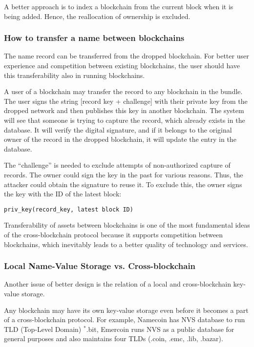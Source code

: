 \begin{multicols}{2}
A better approach is to index a blockchain from the current block when it is being added. Hence, the reallocation of ownership is excluded.

\subsubsection{How to transfer a name between blockchains}\label{subsubsec-4.2.5}

The name record can be transferred from the dropped blockchain. For better user experience and competition between existing blockchains, the user should have this transferability also in running blockchains.

A user of a blockchain may transfer the record to any blockchain in the bundle. The user signs the string [record key + challenge] with their private key from the dropped network and then publishes this key in another blockchain. The system will see that someone is trying to capture the record, which already exists in the database. It will verify the digital signature, and if it belongs to the original owner of the record in the dropped blockchain, it will update the entry in the database.

The “challenge” is needed to exclude attempts of non-authorized capture of records. The owner could sign the key in the past for various reasons. Thus, the attacker could obtain the signature to reuse it. To exclude this, the owner signs the key with the ID of the latest block:
\begin{center}
\texttt{priv\_key(record\_key, latest block ID)}
\end{center}

Transferability of assets between blockchains is one of the most fundamental ideas of the cross-blockchain protocol because it supports competition between blockchains, which inevitably leads to a better quality of technology and services.

\subsubsection{Local Name-Value Storage vs. Cross-blockchain}\label{subsubsec-4.2.6}

Another issue of better design is the relation of a local and cross-blockchain key-value storage.

Any blockchain may have its own key-value storage even before it becomes a part of a cross-blockchain protocol. For example, Namecoin has NVS database to run TLD (Top-Level Domain) $^\ast$.bit, Emercoin runs NVS as a public database for general purposes and also maintains four TLDs (.coin, .emc, .lib, .bazar).


\end{multicols}
